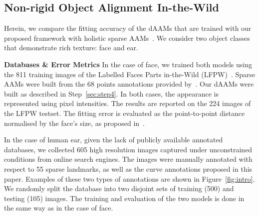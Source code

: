 \subsection{Non-rigid Object Alignment In-the-Wild}
\label{exp:daam_benchmark}
Herein, we compare the fitting accuracy of the dAAMs that are trained with our proposed framework with holistic sparse AAMs~\cite{Cootes2001,Matthews2004,antonakos2015feature}. We consider two object classes that demonstrate rich texture: face and ear.

\noindent\textbf{Databases \& Error Metrics} In the case of face, we trained both models using the 811 training images of the Labelled Faces Parts in-the-Wild (LFPW)~\cite{belhumeur2013localizing}. Sparse AAMs were built from the 68 points annotations provided by~\cite{sagonas_iccv_300w_2013,sagonas2016faces}. Our dAAMs were built as described in Step~\ref{sec:step4}. In both cases, the appearance is represented using pixel intensities. The results are reported on the 224 images of the LFPW testset. The fitting error is evaluated as the point-to-point distance normalised by the face's size, as proposed in~\cite{Zhu2012}.

In the case of human ear, given the lack of publicly available annotated databases, we collected 605 high resolution images captured under unconstrained conditions from online search engines. The images were manually annotated with respect to 55 sparse landmarks, as well as the curve annotations proposed in this paper. Examples of these two types of annotations are shown in Figure~\ref{fig:intro}. We randomly split the database into two disjoint sets of training (500) and testing (105) images. The training and evaluation of the two models is done in the same way as in the case of face.


